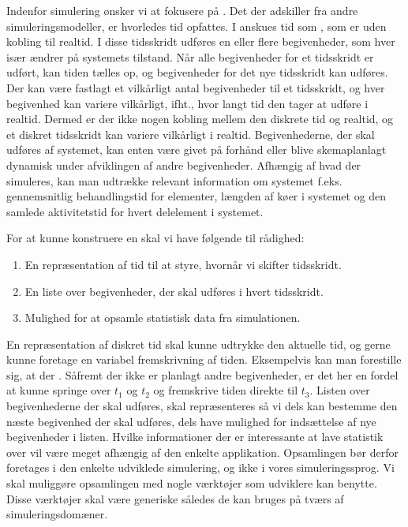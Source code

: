 Indenfor simulering ønsker vi at fokusere på \des. Det der adskiller \des fra andre simuleringsmodeller, er hvorledes tid opfattes. I \des anskues tid som , som er uden kobling til realtid. I disse tidsskridt udføres en eller flere begivenheder, som hver især ændrer på systemets tilstand. Når alle begivenheder for et tidsskridt er udført, kan tiden tælles op, og begivenheder for det nye tidsskridt kan udføres. Der kan være fastlagt et vilkårligt antal begivenheder til et tidsskridt, og hver begivenhed kan variere vilkårligt, ifht., hvor langt tid den tager at udføre i realtid. Dermed er der ikke nogen kobling mellem den diskrete tid og realtid, og et diskret tidsskridt kan variere vilkårligt i realtid. Begivenhederne, der skal udføres af systemet, kan enten være givet på forhånd eller blive skemaplanlagt dynamisk under afviklingen af andre begivenheder. 
Afhængig af hvad der simuleres, kan man udtrække relevant information om systemet f.eks. gennemsnitlig behandlingstid for elementer, længden af køer i systemet og den samlede aktivitetstid for hvert delelement i systemet.

For at kunne konstruere en \des skal vi have følgende til rådighed: 
\begin{enumerate}
\tightlist 
\item En repræsentation af tid til at styre, hvornår vi skifter tidsskridt.
\item En liste over begivenheder, der skal udføres i hvert tidsskridt.
\item Mulighed for at opsamle statistisk data fra simulationen. 
\end{enumerate}
En repræsentation af diskret tid skal kunne udtrykke den aktuelle tid,  og gerne kunne foretage en variabel fremskrivning af tiden. Eksempelvis kan man forestille sig, at der . Såfremt der ikke er planlagt andre begivenheder, er det her en fordel at kunne springe over $t_{1}$ og $t_{2}$ og fremskrive tiden direkte til $t_{3}$. Listen over begivenhederne der skal udføres, skal repræsenteres så vi dels kan bestemme den næste begivenhed der skal udføres, dels have mulighed for indsættelse af nye begivenheder i listen. Hvilke informationer der er interessante at lave statistik over vil være meget afhængig af den enkelte applikation. Opsamlingen bør derfor foretages i den enkelte udviklede simulering, og ikke i vores simuleringssprog. Vi skal muliggøre opsamlingen med nogle værktøjer som udviklere kan benytte. Disse værktøjer skal være generiske således de kan bruges på tværs af simuleringsdomæner. 





